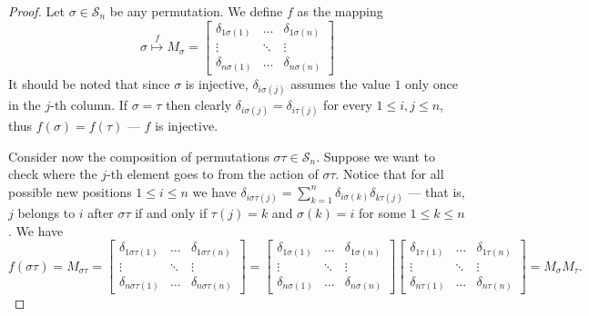 \begin{proof}
  Let \(\sigma \in \mathcal S_n\) be any permutation. We define \(f\) as the
  mapping
  \[
    \sigma \overset f \longmapsto M_\sigma =
    \begin{bmatrix}
      \delta_{1 \sigma(1)} &\dots &\delta_{1 \sigma(n)} \\
      \vdots &\ddots &\vdots \\
      \delta_{n \sigma(1)} &\dots &\delta_{n \sigma(n)}
    \end{bmatrix}
  \]
  It should be noted that since \(\sigma\) is injective, \(\delta_{i
  \sigma(j)}\) assumes the value \(1\) only once in the \(j\)-th column. If
  \(\sigma = \tau\) then clearly \(\delta_{i \sigma(j)} = \delta_{i \tau(j)}\)
  for every \(1 \leq i, j \leq n\), thus \(f(\sigma) = f(\tau)\) --- \(f\) is
  injective.

  Consider now the composition of permutations \(\sigma \tau \in \mathcal S_n\).
  Suppose we want to check where the \(j\)-th element goes to from the action of
  \(\sigma \tau\). Notice that for all possible new positions \(1 \leq i \leq
  n\) we have \(\delta_{i \sigma\tau(j)} = \sum_{k = 1}^n \delta_{i \sigma(k)}
  \delta_{k \tau(j)}\) --- that is, \(j\) belongs to \(i\) after \(\sigma \tau\)
  if and only if \(\tau(j) = k\) and \(\sigma(k) = i\) for some \(1 \leq k \leq
  n\). We have
  \[
    f(\sigma \tau) = M_{\sigma \tau} =
    \begin{bmatrix}
      \delta_{1 \sigma\tau(1)} &\dots &\delta_{1 \sigma\tau(n)} \\
      \vdots &\ddots &\vdots \\
      \delta_{n \sigma\tau(1)} &\dots &\delta_{n \sigma\tau(n)}
    \end{bmatrix}
    =
    \begin{bmatrix}
      \delta_{1 \sigma(1)} &\dots &\delta_{1 \sigma(n)} \\
      \vdots &\ddots &\vdots \\
      \delta_{n \sigma(1)} &\dots &\delta_{n \sigma(n)}
    \end{bmatrix}
    \begin{bmatrix}
      \delta_{1 \tau(1)} &\dots &\delta_{1 \tau(n)} \\
      \vdots &\ddots &\vdots \\
      \delta_{n \tau(1)} &\dots &\delta_{n \tau(n)}
    \end{bmatrix}
    = M_\sigma M_\tau.
  \]
\end{proof}

